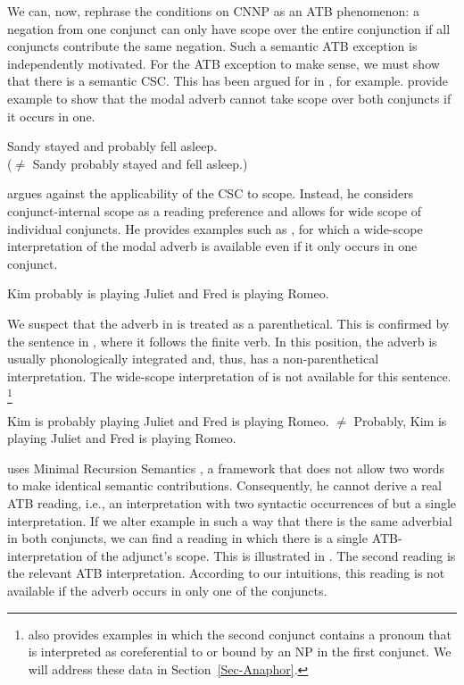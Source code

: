 \documentclass[output=paper]{langsci/langscibook}
\begin{document}
We can, now, rephrase the conditions on CNNP as an ATB phenomenon: a negation from one conjunct can only have scope over the entire conjunction if all conjuncts contribute the same negation. 
%
Such a semantic ATB exception is independently motivated. For the ATB exception to make sense, we must show that there is a semantic CSC. This has been argued for in 
\citet[83]{Winter:01}, for example.
\citet[323]{Copestake:al:05} 
 provide example  to show that the modal adverb  cannot take scope over both conjuncts if it occurs in one.

\ea \label{stay-asleep}
Sandy stayed and probably fell asleep.\\
($\not=$ Sandy probably stayed and fell asleep.)
\z

\citet[86--89]{Chaves:07} argues against the applicability of the CSC to scope. Instead, he considers conjunct-internal scope as a reading preference and allows for wide scope of individual conjuncts. He provides examples such as , for which a wide-scope interpretation of the modal adverb is available even if it only occurs in one conjunct.

\ea \label{romeojuliet}
Kim probably is playing Juliet and Fred is playing Romeo.
\z 

We suspect that the adverb in  is treated as a parenthetical. This is confirmed by the sentence in , where it follows the finite verb. 
In this position, 
the adverb is usually phonologically integrated and, thus, has a non-parenthetical interpretation. 
The wide-scope interpretation of  is not available for this sentence.%
\footnote{\citet{Chaves:07} also provides examples in which the second conjunct contains a pronoun that is interpreted as coreferential to or bound by an NP in the first conjunct. 
We will address these data in Section~\ref{Sec-Anaphor}.}


\ea
\label{romeojuliet2}
Kim is probably playing Juliet and Fred is playing Romeo.
\glt $\not=$ Probably, Kim is playing Juliet and Fred is playing Romeo.
\z 

\citet{Chaves:07} uses Minimal Recursion Semantics \citep{Copestake:al:05}, a
 framework that does not allow two words to make identical semantic contributions. Consequently,
he cannot derive a real ATB reading, i.e., an interpretation with two syntactic occurrences of  but a single interpretation.  
If we alter example  in such a way that there is the same adverbial in both conjuncts, we can find a reading in which there is a single ATB-interpretation of the adjunct's scope. This is illustrated in . The second reading is the relevant ATB interpretation. According to our intuitions, this reading is not available if the adverb  occurs in only one of the conjuncts.
\end{document}
